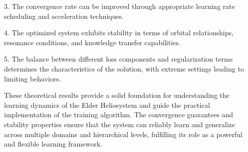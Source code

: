 3. The convergence rate can be improved through appropriate learning rate scheduling and acceleration techniques.

4. The optimized system exhibits stability in terms of orbital relationships, resonance conditions, and knowledge transfer capabilities.

5. The balance between different loss components and regularization terms determines the characteristics of the solution, with extreme settings leading to limiting behaviors.

These theoretical results provide a solid foundation for understanding the learning dynamics of the Elder Heliosystem and guide the practical implementation of the training algorithm. The convergence guarantees and stability properties ensure that the system can reliably learn and generalize across multiple domains and hierarchical levels, fulfilling its role as a powerful and flexible learning framework.